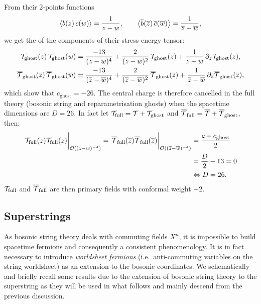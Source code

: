 From their 2-points functions
\begin{equation}
  \left\langle b(z)\, c(w) \right\rangle = \frac{1}{z - w},
  \qquad
  \left\langle \overline{b}(\overline{z})\, \overline{c}(\overline{w}) \right\rangle = \frac{1}{\overline{z} - \overline{w}},
\end{equation}
we get the \ope of the components of their stress-energy tensor:
\begin{equation}
  \begin{split}
    \mathcal{T}_{\text{ghost}}(z)\, \mathcal{T}_{\text{ghost}}(w)
    & =
    \frac{-13}{(z - w)^4}
    +
    \frac{2}{(z - w)^2}\, \mathcal{T}_{\text{ghost}}(z)
    +
    \frac{1}{z - w}\, \partial_{z} \mathcal{T}_{\text{ghost}}(z),
    \\
    \overline{\mathcal{T}}_{\text{ghost}}(\overline{z})\, \overline{\mathcal{T}}_{\text{ghost}}(\overline{w})
    & =
    \frac{-13}{(\overline{z} - \overline{w})^4}
    +
    \frac{2}{(\overline{z} - \overline{w})^2}\, \overline{\mathcal{T}}_{\text{ghost}}(\overline{z})
    +
    \frac{1}{\overline{z} - \overline{w}}\, \partial_{\overline{z}} \overline{\mathcal{T}}_{\text{ghost}}(\overline{z}),
  \end{split}
\end{equation}
which show that $c_{\text{ghost}} = - 26$.
The central charge is therefore cancelled in the full theory (bosonic string and reparametrisation ghosts) when the spacetime dimensions are $D = 26$.
In fact let $\mathcal{T}_{\text{full}} = \mathcal{T} + \mathcal{T}_{\text{ghost}}$ and $\overline{\mathcal{T}}_{\text{full}} = \overline{\mathcal{T}} + \overline{\mathcal{T}}_{\text{ghost}}$, then:
\begin{equation}
  \begin{split}
    \eval{\cT_{\text{full}}( z ) \cT_{\text{full}}( z )}_{\order{(z - w)^{-4}}}
    =
    \eval{\overline{\cT}_{\text{full}}( \barz ) \overline{\cT}_{\text{full}}( \barz )}_{\order{(\barz - \barw)^{-4}}}
    & =
    \frac{c + c_{\text{ghost}}}{2}
    \\
    & =
    \frac{D}{2} - 13
    =
    0
    \\
    & \Leftrightarrow
    D = 26.
  \end{split}
\end{equation}
$\mathcal{T}_{\text{full}}$ and $\overline{\mathcal{T}}_{\text{full}}$ are then primary fields with conformal weight $-2$.


\subsection{Superstrings}

As bosonic string theory deals with commuting fields $X^{\mu}$, it is impossible to build spacetime fermions and consequently a consistent phenomenology.
It is in fact necessary to introduce \emph{worldsheet fermions} (i.e.\ anti-commuting variables on the string worldsheet) as an extension to the bosonic coordinates.
We schematically and briefly recall some results due to the extension of bosonic string theory to the superstring as they will be used in what follows and mainly descend from the previous discussion.


